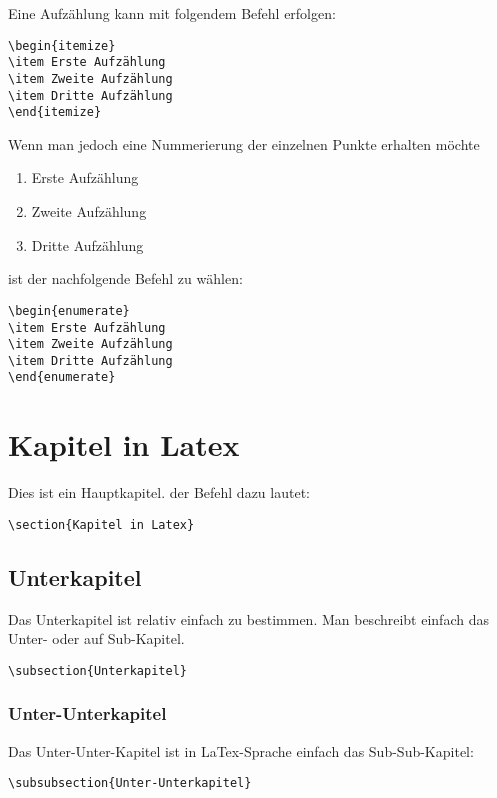 Eine Aufzählung kann mit folgendem Befehl erfolgen:
\begin{verbatim}
\begin{itemize}
\item Erste Aufzählung
\item Zweite Aufzählung
\item Dritte Aufzählung	
\end{itemize}
\end{verbatim}

Wenn man jedoch eine Nummerierung der einzelnen Punkte erhalten möchte
\begin{enumerate}
	\item Erste Aufzählung
	\item Zweite Aufzählung
	\item Dritte Aufzählung	
\end{enumerate}
ist der nachfolgende Befehl zu wählen:
\begin{verbatim}
\begin{enumerate}
\item Erste Aufzählung
\item Zweite Aufzählung
\item Dritte Aufzählung	
\end{enumerate}
\end{verbatim}

\section{Kapitel in Latex}
Dies ist ein Hauptkapitel. der Befehl dazu lautet:
\begin{verbatim}
\section{Kapitel in Latex}
\end{verbatim}

\subsection{Unterkapitel}
Das Unterkapitel ist relativ einfach zu bestimmen. Man beschreibt einfach das Unter- oder auf Sub-Kapitel.
\begin{verbatim}
\subsection{Unterkapitel}
\end{verbatim}

\subsubsection{Unter-Unterkapitel}
Das Unter-Unter-Kapitel ist in LaTex-Sprache einfach das Sub-Sub-Kapitel:
\begin{verbatim}
\subsubsection{Unter-Unterkapitel}
\end{verbatim}

